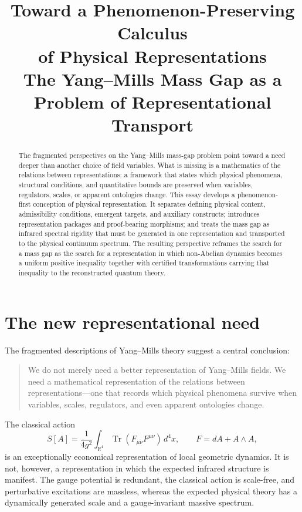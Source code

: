 \documentclass[11pt]{article}
\title{Toward a Phenomenon-Preserving Calculus\\
of Physical Representations\\
\large The Yang--Mills Mass Gap as a Problem of Representational Transport}
\author{}
\date{}
\newcommand{\R}{\mathbb{R}}
\newcommand{\Tr}{\operatorname{Tr}}
\begin{document}
\maketitle

\begin{abstract}
The fragmented perspectives on the Yang--Mills mass-gap problem point toward a
need deeper than another choice of field variables.  What is missing is a
mathematics of the relations between representations: a framework that states
which physical phenomena, structural conditions, and quantitative bounds are
preserved when variables, regulators, scales, or apparent ontologies change.
This essay develops a phenomenon-first conception of physical representation.
It separates defining physical content, admissibility conditions, emergent
targets, and auxiliary constructs; introduces representation packages and
proof-bearing morphisms; and treats the mass gap as infrared spectral rigidity
that must be generated in one representation and transported to the physical
continuum spectrum.  The resulting perspective reframes the search for a mass
gap as the search for a representation in which non-Abelian dynamics becomes a
uniform positive inequality together with certified transformations carrying
that inequality to the reconstructed quantum theory.
\end{abstract}

\section{The new representational need}

The fragmented descriptions of Yang--Mills theory suggest a central conclusion:

\begin{quote}
We do not merely need a better representation of Yang--Mills fields.  We need a
mathematical representation of the relations between representations---one
that records which physical phenomena survive when variables, scales,
regulators, and even apparent ontologies change.
\end{quote}

The classical action
\begin{equation}
  S[A]=\frac{1}{4g^2}\int_{\R^4}
  \Tr(F_{\mu\nu}F^{\mu\nu})\,d^4x,
  \qquad F=dA+A\wedge A,
  \label{eq:action}
\end{equation}
is an exceptionally economical representation of local geometric dynamics.
It is not, however, a representation in which the expected infrared structure
is manifest.  The gauge potential is redundant, the classical action is
scale-free, and perturbative excitations are massless, whereas the expected
physical theory has a dynamically generated scale and a gauge-invariant
massive spectrum.
\end{document}
